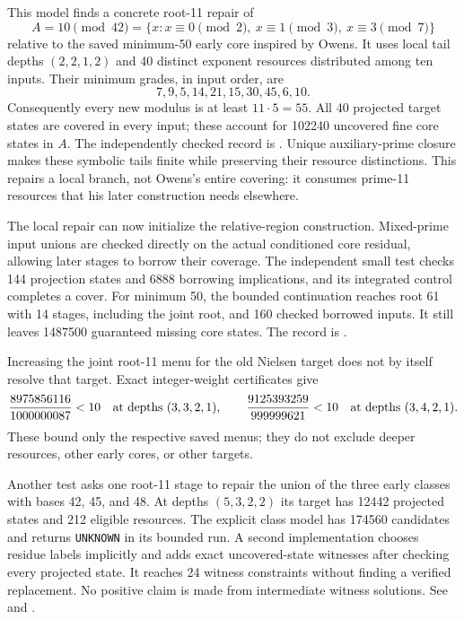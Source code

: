 \documentclass[11pt]{article}
\begin{document}
This model finds a concrete root-11 repair of
\[
 A=10\pmod{42}
  =\{x:x\equiv0\pmod2,\ x\equiv1\pmod3,\ x\equiv3\pmod7\}
\]
relative to the saved minimum-50 early core inspired by Owens.
It uses local tail depths $(2,2,1,2)$ and 40 distinct exponent resources
distributed among ten inputs. Their minimum grades, in input order, are
\[
 7,9,5,14,21,15,30,45,6,10.
\]
Consequently every new modulus is at least $11\cdot5=55$.
All 40 projected target states are covered in every input; these account
for 102240 uncovered fine core states in $A$. The independently checked
record is .
Unique auxiliary-prime closure makes these symbolic tails finite while
preserving their resource distinctions. This repairs a local branch, not
Owens's entire covering: it consumes prime-11 resources that his later
construction needs elsewhere.

The local repair can now initialize the relative-region construction.
Mixed-prime input unions are checked directly on the actual conditioned
core residual, allowing later stages to borrow their coverage.
The independent small test checks 144 projection states and 6888 borrowing
implications, and its integrated control completes a cover.
For minimum 50, the bounded continuation reaches root 61 with 14 stages,
including the joint root, and 160 checked borrowed inputs. It still leaves
1487500 guaranteed missing core states. The record is
.

Increasing the joint root-11 menu for the old Nielsen target does not by
itself resolve that target. Exact integer-weight certificates give
\[
 \frac{8975856116}{1000000087}<10
 \quad\hbox{at depths }(3,3,2,1),\qquad
 \frac{9125393259}{999999621}<10
 \quad\hbox{at depths }(3,4,2,1).
\]
These bound only the respective saved menus; they do not exclude deeper
resources, other early cores, or other targets.

Another test asks one root-11 stage to repair the union of the three early
classes with bases 42, 45, and 48. At depths $(5,3,2,2)$ its target has
12442 projected states and 212 eligible resources. The explicit class
model has 174560 candidates and returns \texttt{UNKNOWN} in its bounded
run. A second implementation chooses residue labels implicitly and adds
exact uncovered-state witnesses after checking every projected state.
It reaches 24 witness constraints without finding a verified replacement.
No positive claim is made from intermediate witness solutions. See
 and
.
\end{document}
